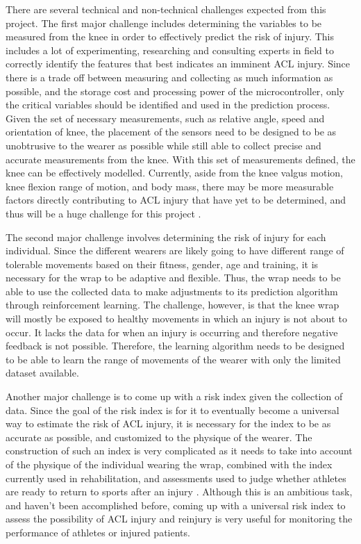 There are several technical and non-technical challenges expected from this project. The first major challenge includes determining the variables to be measured from the knee in order to effectively predict the risk of injury. This includes a lot of experimenting, researching and consulting experts in field to correctly identify the features that best indicates an imminent ACL injury. Since there is a trade off between measuring and collecting as much information as possible, and the storage cost and processing power of the microcontroller, only the critical variables should be identified and used in the prediction process. Given the set of necessary measurements, such as relative angle, speed and orientation of knee, the placement of the sensors need to be designed to be as unobtrusive to the wearer as possible while still able to collect precise and accurate measurements from the knee. With this set of measurements defined, the knee can be effectively modelled. Currently, aside from the knee valgus motion, knee flexion range of motion, and body mass, there may be more measurable factors directly contributing to ACL injury that have yet to be determined, and thus will be a huge challenge for this project \cite{Myer01042011}.

The second major challenge involves determining the risk of injury for each individual. Since the different wearers are likely going to have different range of tolerable movements based on their fitness, gender, age and training, it is necessary for the wrap to be adaptive and flexible. Thus, the wrap needs to be able to use the collected data to make adjustments to its prediction algorithm through reinforcement learning. The challenge, however, is that the knee wrap will mostly be exposed to healthy movements in which an injury is not about to occur. It lacks the data for when an injury is occurring and therefore negative feedback is not possible. Therefore, the learning algorithm needs to be designed to be able to learn the range of movements of the wearer with only the limited dataset available.

Another major challenge is to come up with a risk index given the collection of data. Since the goal of the risk index is for it to eventually become a universal way to estimate the risk of ACL injury, it is necessary for the index to be as accurate as possible, and customized to the physique of the wearer. The construction of such an index is very complicated as it needs to take into account of the physique of the individual wearing the wrap, combined with the index currently used in rehabilitation, and assessments used to judge whether athletes are ready to return to sports after an injury \cite{Sinkjar1991209}. Although this is an ambitious task, and haven’t been accomplished before, coming up with a universal risk index to assess the possibility of ACL injury and reinjury is very useful for monitoring the performance of athletes or injured patients.

